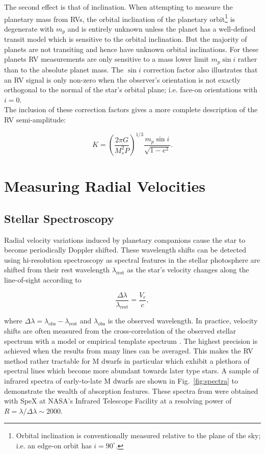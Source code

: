 The second effect is that of inclination. When attempting to measure the planetary 
mass from RVs, the orbital inclination of the planetary orbit\footnote{Orbital 
inclination is conventionally measured  relative 
to the plane of the sky; i.e. an edge-on orbit has $i=90^{\circ}$.} is degenerate with
$m_p$ and is entirely unknown unless the planet has a well-defined transit model which is sensitive
to the orbital inclination. But the majority of planets are not transiting and hence have unknown
orbital inclinations. For these planets RV measurements 
are only sensitive to a mass lower limit $m_p\sin{i}$ rather than to the absolute planet mass.
The $\sin{i}$ correction factor also illustrates that an RV signal is only non-zero when
the observer's orientation is not exactly orthogonal to the normal of the star's orbital plane;
i.e. face-on orientations with $i=0$. \\

The inclusion of these correction factors gives a more complete description of the RV semi-amplitude: 

\begin{equation}
K = \left( \frac{2\pi G}{M_s^2 P} \right)^{1/3} \frac{m_p \sin{i}}{\sqrt{1-e^2}}. 
\label{eq:K2}
\end{equation}

\section{Measuring Radial Velocities} \label{sect:spectrograph}
\subsection{Stellar Spectroscopy}
Radial velocity variations induced by planetary companions cause the star to become 
periodically Doppler shifted. These wavelength shifts can be detected using hi-resolution 
spectroscopy as spectral features in the stellar photosphere are shifted from their 
rest wavelength $\lambda_{\text{rest}}$ as the star's velocity changes along the line-of-sight 
according to 

\begin{equation}
\frac{\Delta \lambda}{\lambda_{\text{rest}}} = \frac{V_r}{c},
\end{equation}

\noindent where $\Delta \lambda = \lambda_{\text{obs}}-\lambda_{\text{rest}}$ and
$\lambda_{\text{obs}}$ is the observed wavelength. 
In practice, velocity shifts are often measured from the cross-correlation of 
the observed stellar spectrum with a model or empirical template spectrum \citep{astudillodefru15}.
The highest precision is achieved when the results from many lines can be averaged. This makes
the RV method rather tractable for M dwarfs in particular which exhibit a plethora of 
spectral lines which become more abundant towards later type stars.
A sample of infrared spectra of early-to-late M dwarfs 
are shown in Fig.~\ref{fig:spectra} to demonstrate the wealth of absorption features. 
These spectra from \cite{rayner09} were obtained 
with SpeX at NASA's Infrared Telescope Facility at a resolving power of 
$R=\lambda / \Delta \lambda \sim 2000$. \\ 

